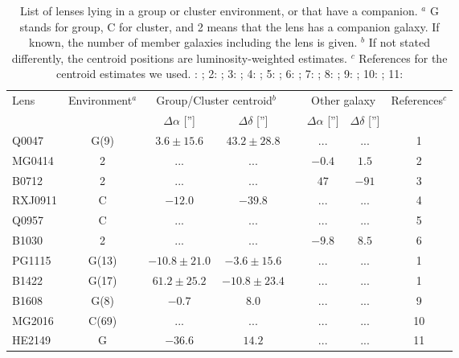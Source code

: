 \documentclass[useAMS,usenatbib]{mn2e}
\begin{document}
\begin{table}
 \begin{center}
  \begin{tabular}{l c c c c c c c}
   \multirow{2}{*}{Lens} & \multirow{2}{*}{Environment$^{a}$} & \multicolumn{2}{c}{Group/Cluster centroid$^{b}$} & & \multicolumn{2}{c}{Other galaxy} & \multirow{2}{*}{References$^{c}$}\\ \cline{3-4} \cline{6-7}
    & & $\Delta\alpha$ [''] & $\Delta\delta$ [''] & & $\Delta\alpha$ [''] & $\Delta\delta$ ['']\\ \hline \hline
   Q0047 & G(9) & $3.6\pm15.6$ & $43.2\pm28.8$ &   & ... & ... & 1\\
   MG0414 & 2 & ... & ... &   & $-0.4$ & $1.5$ & 2\\
   B0712 & 2 & ... & ... &   & $47$ & $-91$ & 3\\
   RXJ0911 & C & $-12.0$ & $-39.8$ &    & ... & ... & 4\\
   Q0957 & C & ... & ... &   & ... & ... & 5\\
   B1030 & 2 & ... & ... &   & $-9.8$ & $8.5$ & 6\\
   PG1115 & G(13) & $-10.8\pm21.0$ & $-3.6\pm15.6$ &   & ... & ... & 1\\
   B1422 & G(17) & $61.2\pm25.2$ & $-10.8\pm23.4$ &   & ... & ... & 1\\
   B1608 & G(8) & $-0.7$ & $8.0$ &   & ... & ... & 9\\
   MG2016 & C(69) & ... & ... &   & ... & ... & 10\\
   HE2149 & G & $-36.6$ & $14.2$ &   & ... & ... & 11\\
  \end{tabular}
  \caption{List of lenses lying in a group or cluster environment, or that have a companion. \newline $^{a}$ G stands for group, C for cluster, and 2 means that the lens has a companion galaxy. If known, the number of member galaxies including the lens is given. \newline $^{b}$ If not stated differently, the centroid positions are luminosity-weighted estimates. \newline $^{c}$ References for the centroid estimates we used. : \cite{2011ApJ...726...84W}; 2: \cite{1993AJ....105....1S}; 3: \cite{2002AJ....123..627F}; 4: \cite{2001ApJ...555....1M}; 5: \cite{1998ApJ...504..661C}; 6: \cite{2000ApJ...536..584L}; 7: \cite{2008ApJ...673..778A}; 8: \cite{2007AJ....134..668A}; 9: \cite{2003MNRAS.344..337T}; 10: \cite{2006ApJ...646...85W}; 11: \cite{2006ApJ...646...85W}}
  \label{tab:environment}
 \end{center}
\end{table}
\end{document}
